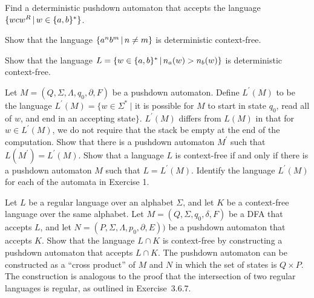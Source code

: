 \begin{exercises}
\problem Find a deterministic pushdown automaton that accepts the language $\{wcw^R\,|\, w\in\{a,b\}^*\}$.

\problem Show that the language $\{a^nb^m\,|\, n\not=m\}$ is deterministic context-free.

\problem Show that the language $L=\{w\in\{a,b\}^*\,|\, n_a(w) > n_b(w)\}$ is deterministic context-free.

\problem Let $M=(Q,\Sigma,\Lambda,q_0,\partial,F)$ be a pushdown automaton.  Define $L^\prime(M)$ to be 
the language $L^\prime(M)=\{w\in\Sigma^*\ |$ it is possible for $M$ to start in state $q_0$,
read all of $w$, and end in an accepting state$\}$.  $L^\prime(M)$ differs from $L(M)$ in that
for $w\in L^\prime(M)$, we do not require that the stack be empty at the end of the computation.
\ppart Show that there is a pushdown automaton $M^\prime$ such that $L(M^\prime)=L^\prime(M)$.
\ppart Show that a language $L$ is context-free if and only if there is a pushdown automaton
$M$ such that $L=L^\prime(M)$.
\ppart Identify the language $L^\prime(M)$ for each of the automata in Exercise 1.

\problem Let $L$ be a regular language over an alphabet $\Sigma$, and let $K$
be a context-free language over the same alphabet.  Let $M=(Q,\Sigma,q_0,\delta,F)$ be a DFA that
accepts $L$, and let $N=(P,\Sigma,\Lambda,p_0,\partial,E))$ be a pushdown automaton that accepts $K$.
Show that the language $L\cap K$ is context-free by constructing a pushdown automaton
that accepts $L\cap K$.  The pushdown automaton can be constructed as a ``cross product''
of $M$ and $N$ in which the set of states is $Q\times P$.  The construction is analogous
to the proof that the intersection of two regular languages is regular, as outlined
in Exercise~3.6.7.


\end{exercises}





